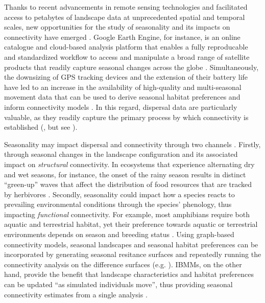 \documentclass[abstract=on,10pt,a4paper,bibliography=totocnumbered]{article}
\begin{document}
Thanks to recent advancements in remote sensing technologies and facilitated
access to petabytes of landscape data at unprecedented spatial and temporal
scales, new opportunities for the study of seasonality and its impacts on
connectivity have emerged \citep{Toth.2016}. Google Earth Engine, for instance,
is an online catalogue and cloud-based analysis platform that enables a fully
reproducable and standardized workflow to access and manipulate a broad range of
satellite products that readily capture seasonal changes across the globe
\citep{Zhao.2021}. Simultaneously, the downsizing of GPS tracking devices and
the extension of their battery life have led to an increase in the availability
of high-quality and multi-seasonal movement data \citep{Cagnacci.2010,
Kays.2015} that can be used to derive seasonal habitat preferences
\citep{Fortin.2005, Manly.2007, Cushman.2010} and inform connectivity models
\citep{Diniz.2019}. In this regard, dispersal data are particularly valuable, as
they readily capture the primary process by which connectivity is established
(\citealp{Elliot.2014, Vasudev.2015}, but see \citealp{Fattebert.2015}).

Seasonality may impact dispersal and connectivity through two channels
\citep{Mui.2017}. Firstly, through seasonal changes in the landscape
configuration and its associated impact on \textit{structural} connectivity. In
ecosystems that experience alternating dry and wet seasons, for instance, the
onset of the rainy season results in distinct ``green-up'' waves that affect the
distribution of food resources that are tracked by herbivores
\citep{Merkle.2016}. Secondly, seasonality could impact how a species reacts to
prevailing environmental conditions through the species' phenology, thus
impacting \textit{functional} connectivity. For example, most amphibians require
both aquatic and terrestrial habitat, yet their preference towards aquatic or
terrestrial environments depends on season and breeding status
\citep{Baldwin.2006}. Using graph-based connectivity models, seasonal landscapes
and seasonal habitat preferences can be incorporated by generating seasonal
resitance surfaces and repeatedly running the connectivity analysis on the
difference surfaces (e.g. \citealp{Chetkiewicz.2009,Cushman.2010, Osipova.2019,
Zeller.2020, Kaszta.2021, Ciudad.2021}). IBMMs, on the other hand, provide the
benefit that landscape characteristics and habitat preferences can be updated
``as simulated individuals move'', thus providing seasonal connectivity
estimates from a single analysis \citep{Zeller.2020}.
\end{document}
